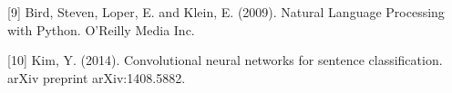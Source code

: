 \documentclass{article} %
\begin{document}
{[9] Bird, Steven, Loper, E. and Klein, E. (2009). Natural Language Processing with Python. O'Reilly Media Inc.

[10] Kim, Y. (2014). Convolutional neural networks for sentence classification. arXiv preprint arXiv:1408.5882.



%
%



}
\end{document}
